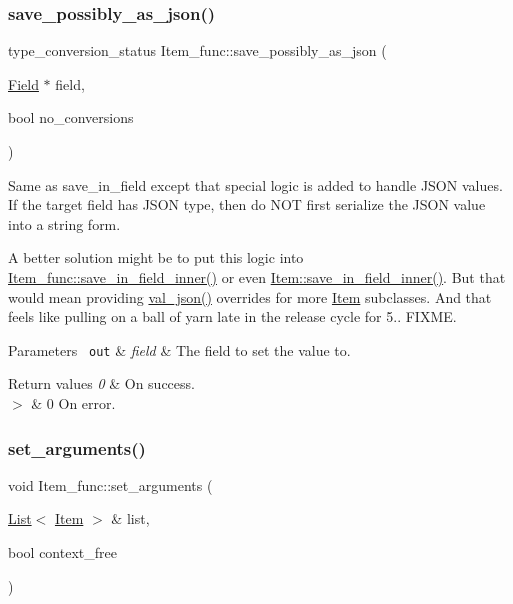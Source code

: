 \subsubsection{\texorpdfstring{save\+\_\+possibly\+\_\+as\+\_\+json()}{save\_possibly\_as\_json()}}
{\footnotesize\ttfamily type\+\_\+conversion\+\_\+status Item\+\_\+func\+::save\+\_\+possibly\+\_\+as\+\_\+json (\begin{DoxyParamCaption}\item[{\mbox{\hyperlink{classField}{Field}} $\ast$}]{field,  }\item[{bool}]{no\+\_\+conversions }\end{DoxyParamCaption})\hspace{0.3cm}{\ttfamily [virtual]}}

Same as save\+\_\+in\+\_\+field except that special logic is added to handle J\+S\+ON values. If the target field has J\+S\+ON type, then do N\+OT first serialize the J\+S\+ON value into a string form.

A better solution might be to put this logic into \mbox{\hyperlink{classItem_a463ded5f3c21ed2508dd8fddc6024722}{Item\+\_\+func\+::save\+\_\+in\+\_\+field\+\_\+inner()}} or even \mbox{\hyperlink{classItem_a463ded5f3c21ed2508dd8fddc6024722}{Item\+::save\+\_\+in\+\_\+field\+\_\+inner()}}. But that would mean providing \mbox{\hyperlink{classItem_a57e763fcde2d0a819d21e31c59611290}{val\+\_\+json()}} overrides for more \mbox{\hyperlink{classItem}{Item}} subclasses. And that feels like pulling on a ball of yarn late in the release cycle for 5.. F\+I\+X\+ME.


\begin{DoxyParams}[1]{Parameters}
\mbox{\texttt{ out}}  & {\em field} & The field to set the value to. \\
\hline
\end{DoxyParams}

\begin{DoxyRetVals}{Return values}
{\em 0} & On success. \\
\hline
{\em $>$} & 0 On error. \\
\hline
\end{DoxyRetVals}
\mbox{\label{classItem__func_a8c269f3ddcc768992ac5b3dbeebe79a5}} 
\subsubsection{\texorpdfstring{set\+\_\+arguments()}{set\_arguments()}}
{\footnotesize\ttfamily void Item\+\_\+func\+::set\+\_\+arguments (\begin{DoxyParamCaption}\item[{\mbox{\hyperlink{classList}{List}}$<$ \mbox{\hyperlink{classItem}{Item}} $>$ \&}]{list,  }\item[{bool}]{context\+\_\+free }\end{DoxyParamCaption})}

